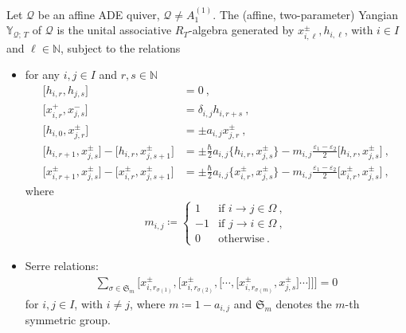 \documentclass[reqno,a4paper]{amsart}
\newcommand{\N}{\mathbb{N}}
\newcommand{\Y}{\mathbb{Y}}
\newcommand{\frakS}{\mathfrak{S}}
\newcommand{\qv}{\mathcal{Q}}
\theoremstyle{basic-theorem}
\numberwithin{equation}{section}
\begin{document}
\begin{definition}\label{def:affine-Yangian}
	Let $\qv$ be an affine ADE quiver, $\qv\neq A_1^{(1)}$. The (affine, two-parameter) Yangian $\Y_{\qv;\, T}$ of $\qv$ is the unital associative $R_T$-algebra generated by $x_{i, \ell}^\pm, h_{i, \ell}$, with $i \in I$ and $\ell \in \N$, subject to the relations
	\begin{itemize}\itemsep0.2cm
		
		\item for any $i, j\in I$ and $r,s\in \N$
		\begin{align}\label{eq:affine-Yangian-Lie-algebra-2}
			\Big[h_{i,r}, h_{j,s}\Big]  & = 0\ ,\\[4pt]  \label{eq:affine-Yangian-Lie-algebra-3}
			\Big[x_{i,r}^{+}, x_{j,s}^{-}\Big] &= \delta_{i,j} h_{i, r+s} \ , \\[4pt] \label{eq:affine-Yangian-4}
			\Big[h_{i,0}, x_{j,r}^\pm\Big]&=\pm a_{i,j}x_{j,r}^\pm\ , \\[4pt]\label{eq:affine-Yangian-5}
			\Big[h_{i, r+1}, x_{j, s}^{\pm}\Big] - \Big[h_{i, r}, x_{j, s+1}^{\pm}\Big]& = \pm \frac{\hbar}{2} a_{i,j} \Big\{h_{i, r}, x_{j, s}^{\pm}\Big\}-m_{i,j}\frac{\varepsilon_1-\varepsilon_2}{2}\Big[h_{i,r},x_{j,s}^{\pm}\Big]\ ,\\[4pt] \label{eq:affine-Yangian-6}
			\Big[x_{i, r+1}^{\pm}, x_{j, s}^{\pm}\Big] - \Big[x_{i, r}^{\pm}, x_{j, s+1}^{\pm}\Big] &= \pm \frac{\hbar}{2} a_{i,j} \Big\{x_{i, r}^{\pm}, x_{j, s}^{\pm}\Big\}-m_{i,j}\frac{\varepsilon_1-\varepsilon_2}{2}\Big[x_{i,r}^{\pm},x_{j,s}^{\pm}\Big] \ ,
		\end{align}
		where
		\begin{align}
			m_{i,j}\coloneqq \begin{cases}
				1 & \text{if } i\to j\in \Omega\ , \\
				-1 & \text{if } j\to i \in \Omega \ , \\
				0 & \text{otherwise} \ .
			\end{cases}
		\end{align}
		
		\item Serre relations: 
		\begin{align}\label{eq:affine-Yangian-Serre}
			\sum_{\sigma \in \frakS_m}\Big[x_{i, r_{\sigma(1)}}^{\pm}, \Big[x_{i, r_{\sigma(2)}}^{\pm}, \Big[\cdots, \Big[x_{i, r_{\sigma(m)}}^{\pm}, x_{j,s}^{\pm}\Big]\cdots\Big]\Big]\Big] = 0 
		\end{align}
		for $i, j\in I$, with $i \neq j$, where $m\coloneqq 1 - a_{i,j}$ and $\frakS_m$ denotes the $m$-th symmetric group. 
	\end{itemize}	
\end{definition}
\end{document}
